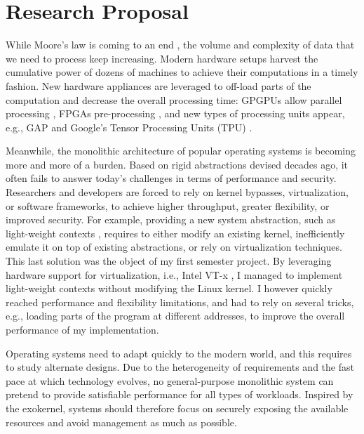 \section{Research Proposal}

While Moore's law is coming to an end \cite{DBLP:journals/cse/TheisW17,DBLP:journals/computer/DeBenedictis17}, the volume and complexity of data that we need to process keep increasing.
Modern hardware setups harvest the cumulative power of dozens of machines to achieve their computations in a timely fashion.
New hardware appliances are leveraged to off-load parts of the computation and decrease the overall processing time: GPGPUs allow parallel processing \cite{DBLP:journals/pvldb/YuanL013,DBLP:conf/damon/KaldeweyLMV12,DBLP:journals/pvldb/Ailamaki15}, FPGAs pre-processing \cite{DBLP:journals/cacm/PutnamCCCCDEFGG16}, and new types of processing units appear, e.g., GAP \cite{DARPAGAP} and Google's Tensor Processing Units (TPU) \cite{GoogleTPU}.

Meanwhile, the monolithic architecture of popular operating systems is becoming more and more of a burden.
Based on rigid abstractions devised decades ago, it often fails to answer today's challenges in terms of performance and security.
Researchers and developers are forced to rely on kernel bypasses, virtualization, or software frameworks, to achieve higher throughput, greater flexibility, or improved security.
For example, providing a new system abstraction, such as light-weight contexts \cite{DBLP:conf/osdi/LittonVE0BD16}, requires to either modify an existing kernel, inefficiently emulate it on top of existing abstractions, or rely on virtualization techniques.
This last solution was the object of my first semester project.
By leveraging hardware support for virtualization, i.e., Intel VT-x \cite{DBLP:journals/computer/UhligNRSMABKLS05}, I managed to implement light-weight contexts without modifying the Linux kernel.
I however quickly reached performance and flexibility limitations, and had to rely on several tricks, e.g., loading parts of the program at different addresses, to improve the overall performance of my implementation.

Operating systems need to adapt quickly to the modern world, and this requires to study alternate designs.
Due to the heterogeneity of requirements and the fast pace at which technology evolves, no general-purpose monolithic system can pretend to provide satisfiable performance for all types of workloads.
Inspired by the exokernel, systems should therefore focus on securely exposing the available resources and avoid management as much as possible.

